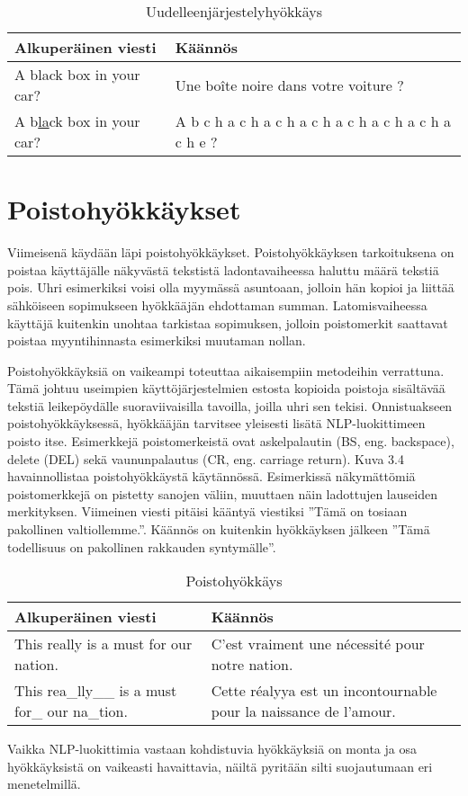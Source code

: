 \begin{table}[hbt]
  \caption{Uudelleenjärjestelyhyökkäys \citep{boucher2021bad}}
  \begin{tabular}{| l | m{20em} |}
    \hline
    Alkuperäinen viesti & Käännös\\
    \hline
    A black box in your car? & Une boîte noire dans votre voiture ?\\
    \hline
    A b\underline{la}ck box in your car? & A b c h a c h a c h a c h a c h a c h a c h a c h e ?\\
    \hline
  \end{tabular}
\end{table}

\section{Poistohyökkäykset}

Viimeisenä käydään läpi poistohyökkäykset. Poistohyökkäyksen tarkoituksena on poistaa käyttäjälle näkyvästä tekstistä ladontavaiheessa haluttu määrä tekstiä pois. Uhri esimerkiksi voisi olla myymässä asuntoaan, jolloin hän kopioi ja liittää sähköiseen sopimukseen hyökkääjän ehdottaman summan. Latomisvaiheessa käyttäjä kuitenkin unohtaa tarkistaa sopimuksen, jolloin poistomerkit saattavat poistaa myyntihinnasta esimerkiksi muutaman nollan.

Poistohyökkäyksiä on vaikeampi toteuttaa aikaisempiin metodeihin verrattuna. Tämä johtuu useimpien käyttöjärjestelmien estosta kopioida poistoja sisältävää tekstiä leikepöydälle suoraviivaisilla tavoilla, joilla uhri sen tekisi. Onnistuakseen poistohyökkäyksessä, hyökkääjän tarvitsee yleisesti lisätä NLP-luokittimeen poisto itse. Esimerkkejä poistomerkeistä ovat askelpalautin (BS, eng. backspace), delete (DEL) sekä vaununpalautus (CR, eng. carriage return). \citep{boucher2021bad}
Kuva 3.4 havainnollistaa poistohyökkäystä käytännössä. Esimerkissä  näkymättömiä poistomerkkejä on pistetty sanojen väliin, muuttaen näin ladottujen lauseiden merkityksen. Viimeinen viesti pitäisi kääntyä viestiksi ''Tämä on tosiaan pakollinen valtiollemme.''. Käännös on kuitenkin hyökkäyksen jälkeen ''Tämä todellisuus on pakollinen rakkauden syntymälle''.

\begin{table}[hbt]
  \caption{Poistohyökkäys \citep{boucher2021bad}}
  \begin{tabular}{| l | m{17em} |}
    \hline
    Alkuperäinen viesti & Käännös\\
    \hline
    This really is a must for our nation. & C'est vraiment une nécessité pour notre nation.\\
    \hline
    This rea\_lly\_\_ is a must for\_ our na\_tion. & Cette réalyya est un incontournable pour la naissance de l'amour.\\
    \hline
  \end{tabular}
\end{table}

Vaikka NLP-luokittimia vastaan kohdistuvia hyökkäyksiä on monta ja osa hyökkäyksistä on vaikeasti havaittavia, näiltä pyritään silti suojautumaan eri menetelmillä.